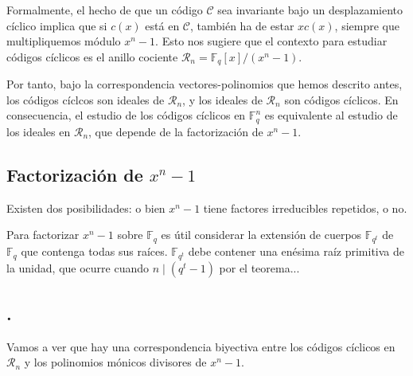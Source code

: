 Formalmente, el hecho de que un código \(\mathcal C\) sea invariante bajo un desplazamiento cíclico implica que si \(c(x)\) está en \(\mathcal C\), también ha de estar \(xc(x)\), siempre que multipliquemos módulo \(x^n -1\). 
Esto nos sugiere que el contexto para estudiar códigos cíclicos es el anillo cociente \(\mathcal R_n = \mathbb F_q[x]/(x^n - 1)\).

Por tanto, bajo la correspondencia vectores-polinomios que hemos descrito antes, los códigos cíclcos son ideales de \(\mathcal R_n\), y los ideales de \(\mathcal R_n\) son códigos cíclicos.
En consecuencia, el estudio de los códigos cíclicos en \(\mathbb F_q^n\) es equivalente al estudio de los ideales en \(\mathcal R_n\), que depende de la factorización de \(x^n-1\).

\subsection{Factorización de \(x^n -1\)}

Existen dos posibilidades: o bien \(x^n -1\) tiene factores irreducibles repetidos, o no.

Para factorizar \(x^n - 1\) sobre \(\mathbb F_q\) es útil considerar la extensión de cuerpos \(\mathbb F_{q^t}\) de \(\mathbb F_q\) que contenga todas sus raíces.
\(\mathbb F_{q^t}\) debe contener una enésima raíz primitiva de la unidad, que ocurre cuando \(n \mid (q^t - 1)\) por el teorema... 

\subsection{.}

Vamos a ver que hay una correspondencia biyectiva entre los códigos cíclicos en \(\mathcal R_n\) y los polinomios mónicos divisores de \(x^n-1\).

